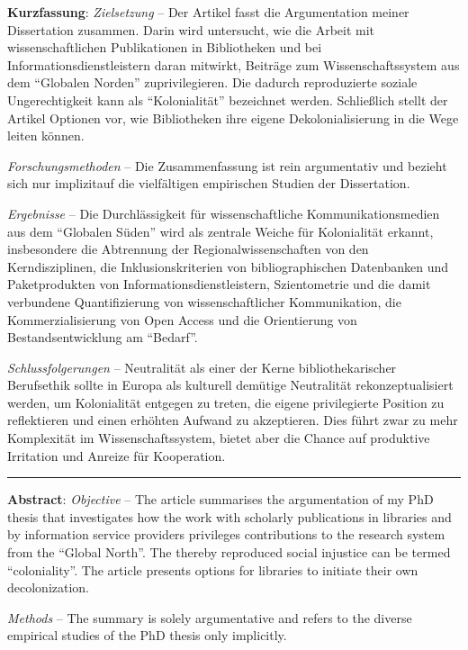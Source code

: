 \textbf{Kurzfassung}: \textit{Zielsetzung} -- Der Artikel fasst die Argumentation
meiner Dissertation zusammen. Darin wird untersucht, wie die Arbeit mit
wissenschaftlichen Publikationen in Bibliotheken und bei
Informationsdienstleistern daran mitwirkt, Beiträge zum
Wissenschaftssystem aus dem \enquote{Globalen Norden} zuprivilegieren. Die
dadurch reproduzierte soziale Ungerechtigkeit kann als \enquote{Kolonialität}
bezeichnet werden. Schließlich stellt der Artikel Optionen vor, wie
Bibliotheken ihre eigene Dekolonialisierung in die Wege leiten können.

\textit{Forschungsmethoden} -- Die Zusammenfassung ist rein argumentativ und
bezieht sich nur implizitauf die vielfältigen empirischen Studien der
Dissertation.

\textit{Ergebnisse} -- Die Durchlässigkeit für wissenschaftliche
Kommunikationsmedien aus dem \enquote{Globalen Süden} wird als zentrale Weiche
für Kolonialität erkannt, insbesondere die Abtrennung der
Regionalwissenschaften von den Kerndisziplinen, die Inklusionskriterien
von bibliographischen Datenbanken und Paketprodukten von
Informationsdienstleistern, Szientometrie und die damit verbundene
Quantifizierung von wissenschaftlicher Kommunikation, die
Kommerzialisierung von Open Access und die Orientierung von
Bestandsentwicklung am \enquote{Bedarf}.

\textit{Schlussfolgerungen} -- Neutralität als einer der Kerne bibliothekarischer
Berufsethik sollte in Europa als kulturell demütige Neutralität
rekonzeptualisiert werden, um Kolonialität entgegen zu treten, die
eigene privilegierte Position zu reflektieren und einen erhöhten Aufwand
zu akzeptieren. Dies führt zwar zu mehr Komplexität im
Wissenschaftssystem, bietet aber die Chance auf produktive Irritation
und Anreize für Kooperation.

\begin{center}\rule{0.5\linewidth}{0.5pt}\end{center}

\textbf{Abstract}: \textit{Objective} -- The article summarises the argumentation
of my PhD thesis that investigates how the work with scholarly
publications in libraries and by information service providers
privileges contributions to the research system from the \enquote{Global
North}. The thereby reproduced social injustice can be termed
\enquote{coloniality}. The article presents options for libraries to initiate
their own decolonization.

\textit{Methods} -- The summary is solely argumentative and refers to the diverse
empirical studies of the PhD thesis only implicitly.

